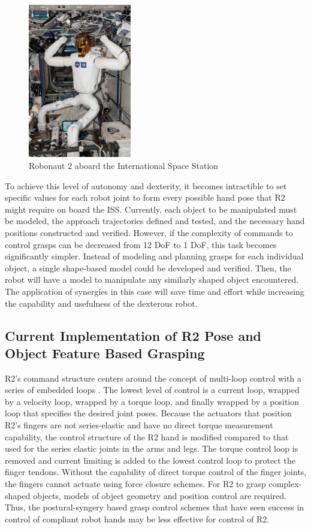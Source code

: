 \documentclass[runningheads,a4paper]{llncs}
\begin{document}
  \begin{figure}[t]
   \centering
   \includegraphics[width=0.4\textwidth]{r2_iss}
   \caption{Robonaut 2 aboard the International Space Station}
   \label{at_r2_iss}
  \end{figure}

To achieve this level of autonomy and dexterity, it becomes intractible to set specific values for each robot joint to form every possible hand pose that R2 might require on board the ISS. Currently, each object to be manipulated must be modeled, the approach trajectories defined and tested, and the necessary hand positions constructed and verified. However, if the complexity of commands to control grasps can be decreased from 12 DoF to 1 DoF, this task becomes significantly simpler. Instead of modeling and planning grasps for each individual object, a single shape-based model could be developed and verified. Then, the robot will have a model to manipulate any similarly shaped object encountered. The application of synergies in this case will save time and effort while increasing the capability and usefulness of the dexterous robot.  


\subsection{Current Implementation of R2 Pose and Object Feature Based Grasping}
R2's command structure centers around the concept of multi-loop control with a series of embedded loops \cite{r2_control}. The lowest level of control is a current loop, wrapped by a velocity loop, wrapped by a torque loop, and finally wrapped by a position loop that specifies the desired joint poses. 
Because the actuators that position R2's fingers are not series-elastic and have no direct torque measurement capability, the control structure of the R2 hand is modified compared to that used for the series elastic joints in the arms and legs. The torque control loop is removed and current limiting is added to the lowest control loop to protect the finger tendons. Without the capability of direct torque control of the finger joints, the fingers cannot actuate using force closure schemes. For R2 to grasp complex-shaped objects, models of object geometry and position control are required. Thus, the postural-syngery based grasp control schemes that have seen success in control of compliant robot hands \cite{softhand} may be less effective for control of R2. 
\end{document}
